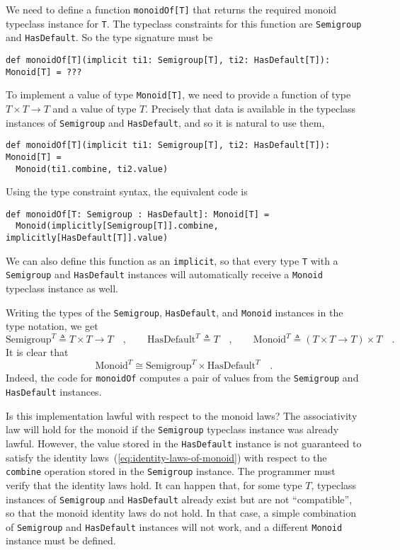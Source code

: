 We need to define a function \lstinline!monoidOf[T]! that returns
the required monoid typeclass instance for \lstinline!T!. The typeclass
constraints for this function are \lstinline!Semigroup! and \lstinline!HasDefault!.
So the type signature must be
\begin{lstlisting}
def monoidOf[T](implicit ti1: Semigroup[T], ti2: HasDefault[T]): Monoid[T] = ???
\end{lstlisting}
To implement a value of type \lstinline!Monoid[T]!, we need to provide
a function of type $T\times T\rightarrow T$ and a value of type $T$.
Precisely that data is available in the typeclass instances of \lstinline!Semigroup!
and \lstinline!HasDefault!, and so it is natural to use them,
\begin{lstlisting}
def monoidOf[T](implicit ti1: Semigroup[T], ti2: HasDefault[T]): Monoid[T] =
  Monoid(ti1.combine, ti2.value)
\end{lstlisting}
Using the type constraint syntax, the equivalent code is
\begin{lstlisting}
def monoidOf[T: Semigroup : HasDefault]: Monoid[T] =
  Monoid(implicitly[Semigroup[T]].combine, implicitly[HasDefault[T]].value)
\end{lstlisting}
We can also define this function as an \lstinline!implicit!, so that
every type \lstinline!T! with a \lstinline!Semigroup! and \lstinline!HasDefault!
instances will automatically receive a \lstinline!Monoid! typeclass
instance as well.

Writing the types of the \lstinline!Semigroup!, \lstinline!HasDefault!,
and \lstinline!Monoid! instances in the type notation, we get
\[
\text{Semigroup}^{T}\triangleq T\times T\rightarrow T\quad,\quad\quad\text{HasDefault}^{T}\triangleq T\quad,\quad\quad\text{Monoid}^{T}\triangleq\left(T\times T\rightarrow T\right)\times T\quad.
\]
It is clear that
\[
\text{Monoid}^{T}\cong\text{Semigroup}^{T}\times\text{HasDefault}^{T}\quad.
\]
Indeed, the code for \lstinline!monoidOf! computes a pair of values
from the \lstinline!Semigroup! and \lstinline!HasDefault! instances. 

Is this implementation lawful with respect to the monoid laws? The
associativity law will hold for the monoid if the \lstinline!Semigroup!
typeclass instance was already lawful. However, the value stored in
the \lstinline!HasDefault! instance is not guaranteed to satisfy
the identity laws~(\ref{eq:identity-laws-of-monoid}) with respect
to the \lstinline!combine! operation stored in the \lstinline!Semigroup!
instance. The programmer must verify that the identity laws hold.
It can happen that, for some type $T$, typeclass instances of \lstinline!Semigroup!
and \lstinline!HasDefault! already exist but are not ``compatible'',
so that the monoid identity laws do not hold. In that case, a simple
combination of \lstinline!Semigroup! and \lstinline!HasDefault!
instances will not work, and a different \lstinline!Monoid! instance
must be defined.

